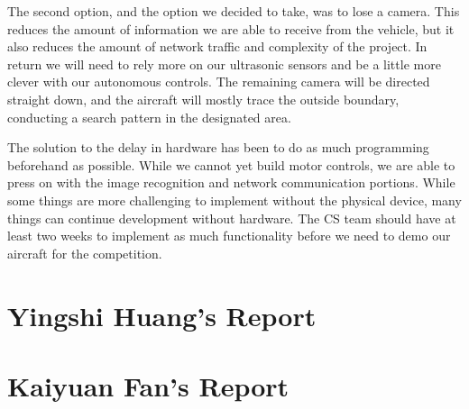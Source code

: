 \documentclass[onecolumn, draftclsnofoot,10pt, compsoc]{IEEEtran}
\begin{document}
The second option, and the option we decided to take, was to lose a camera. This reduces the amount of information we are able to receive from the vehicle, but it also reduces the amount of network traffic and complexity of the project. In return we will need to rely more on our ultrasonic sensors and be a little more clever with our autonomous controls. The remaining camera will be directed straight down, and the aircraft will mostly trace the outside boundary, conducting a search pattern in the designated area.

The solution to the delay in hardware has been to do as much programming beforehand as possible. While we cannot yet build motor controls, we are able to press on with the image recognition and network communication portions. While some things are more challenging to implement without the physical device, many things can continue development without hardware. The CS team should have at least two weeks to implement as much functionality before we need to demo our aircraft for the competition.




\section{Yingshi Huang's Report}





\section{Kaiyuan Fan's Report}
\end{document}

